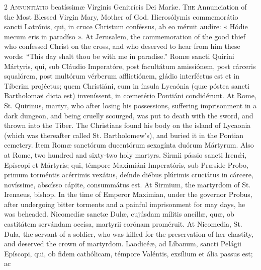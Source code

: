 \begin{paracol}{2}
\lettrine[lines=2]{A}{nnuntiátio} beatíssimæ Vírginis Genitrícis Dei 
 Maríæ.
\switchcolumn
{}
\lettrine[lines=2]{T}{he} Annunciation of the Most Blessed Virgin Mary, Mother of God.
\switchcolumn*
{}
Hierosólymis commemorátio sancti Latrónis, qui, in cruce Christum conféssus, 
 ab eo méruit audíre: « Hódie mecum eris in 
 paradíso ».
\switchcolumn
{}
At Jerusalem, the commemoration of the good thief who confessed Christ on 
 the cross, and who deserved to hear from him these words: ``This day shalt 
 thou be with me in paradise.''
\switchcolumn*
{}
Romæ sancti Quiríni Mártyris, qui, sub Cláudio 
 Imperatóre, post facultátum amissiónem, post cárceris squalórem, post 
 multórum vérberum afflictiónem, gládio interféctus est et in Tíberim 
 projéctus; quem Christiáni, cum in ínsula Lycaónia (quæ póstea sancti 
 Bartholomæi dicta est) inveníssent, in cœmetério Pontiáni condidérunt.
\switchcolumn
{}
At Rome, St. Quirinus, martyr, who after losing his possessions, suffering 
 imprisonment in a dark dungeon, and being cruelly scourged, was put to death 
 with the sword, and thrown into the Tiber. The Christians found his 
 body on the island of Lycaonia (which was thereafter called St. 
 Bartholomew's), and buried it in the Pontian cemetery.
\switchcolumn*
{}
Item Romæ sanctórum ducentórum sexagínta duórum 
 Mártyrum.
\switchcolumn
{}
Also at Rome, two hundred and sixty-two holy martyrs.
\switchcolumn*
{}
Sírmii pássio sancti Irenǽi, Epíscopi et 
 Mártyris; qui, témpore Maximiáni Imperatóris, sub Præside Probo, 
 primum torméntis acérrimis vexátus, deínde diébus plúrimis cruciátus in cárcere, novíssime, abscísso cápite, consummátus est.
\switchcolumn
{}
At Sirmium, the martyrdom of St. Irenaeus, bishop. In the time of 
 Emperor Maximian, under the governor Probus, after undergoing bitter 
 torments and a painful imprisonment for may days, he was beheaded.
\switchcolumn*
{}
Nicomedíæ sanctæ Dulæ, cujúsdam mílitis ancíllæ, 
 quæ, ob castitátem servándam occísa, martyrii corónam proméruit.
\switchcolumn
{}
At Nicomedia, St. Dula, the servant of a soldier, who was killed for the 
 preservation of her chastity, and deserved the crown of martyrdom.
\switchcolumn*
{}
Laodicéæ, ad Líbanum, sancti Pelágii Epíscopi, 
 qui, ob fidem cathólicam, témpore Valéntis, exsílium et ália passus est; ac 

\end{paracol}

